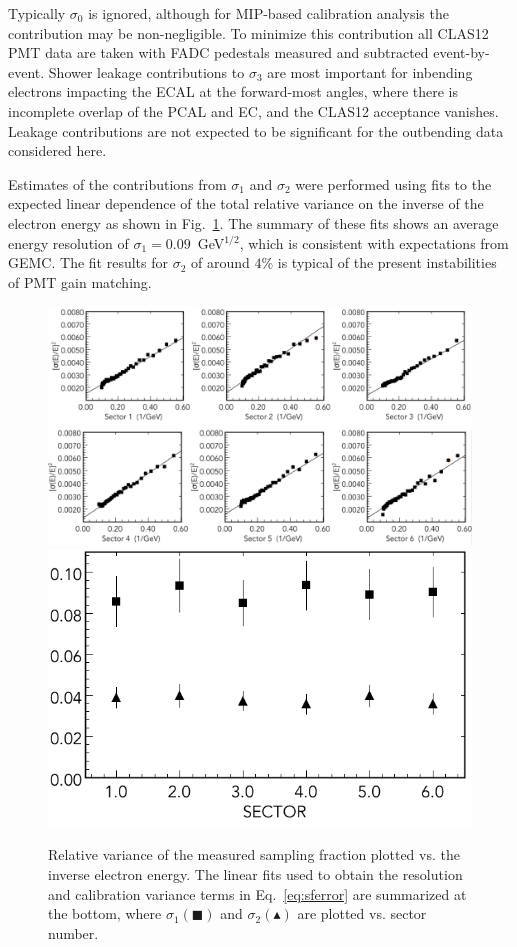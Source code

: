 Typically $\sigma_0$ is ignored, although for MIP-based calibration analysis the contribution may be non-negligible.
To minimize this contribution all CLAS12 PMT data are taken with FADC pedestals measured and subtracted
event-by-event. Shower leakage contributions to $\sigma_3$ are most important for inbending electrons impacting
the ECAL at the forward-most angles, where there is incomplete overlap of the PCAL and EC, and the CLAS12
acceptance vanishes. Leakage contributions are not expected to be significant for the outbending data considered
here.

Estimates of the contributions from $\sigma_1$ and $\sigma_2$ were performed using fits to the expected linear
dependence of the total relative variance on the inverse of the electron energy as shown in Fig.~\ref{fig:S10_1_1}.
The summary of these fits shows an average energy resolution of $\sigma_1 = 0.09$~GeV$^{1/2}$, which is consistent
with expectations from GEMC. The fit results for $\sigma_2$ of around $4\%$ is typical of the present instabilities
of PMT gain matching.
 
\begin{figure}[t]
\centering
\includegraphics[width=1.0\columnwidth,keepaspectratio]{img/S10_1_1.png}
\includegraphics[width=0.5\columnwidth,keepaspectratio]{img/S10_1_2.png}
\caption[]{Relative variance of the measured sampling fraction plotted vs. the inverse electron energy. The
  linear fits used to obtain the resolution and calibration variance terms in Eq.~\ref{eq:sferror} are summarized
  at the bottom, where $\sigma_1 (\blacksquare)$ and $\sigma_2 (\blacktriangle)$ are plotted vs. sector number.}
\label{fig:S10_1_1}
\end{figure}

